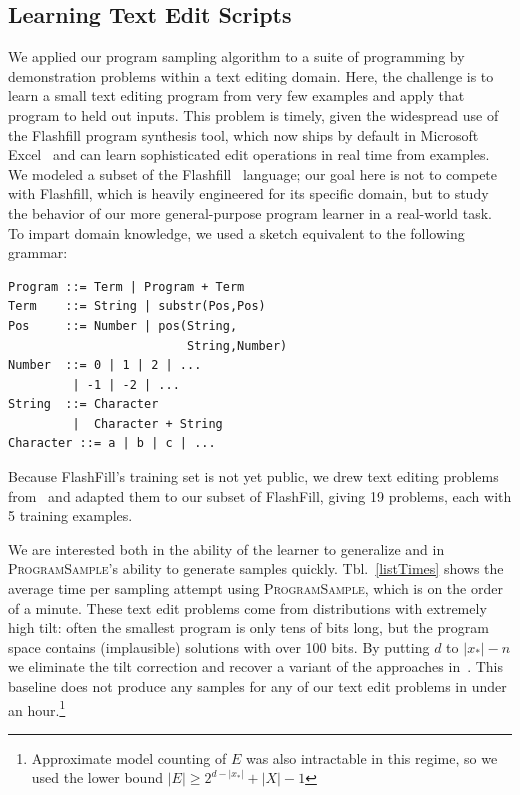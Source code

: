 \documentclass{article}
\newcommand{\theSystem}{\textsc{ProgramSample}}
\begin{document}
\subsection{Learning Text Edit Scripts}
We applied our program sampling algorithm to a suite of programming by demonstration problems within a text editing domain.
Here, the challenge is to learn a small text editing program from very few examples
and apply that program to held out inputs.
This problem is timely, given the widespread use of the Flashfill program synthesis tool, which now ships by default in Microsoft Excel~\cite{real_world} and can learn sophisticated edit operations in real time from examples.
We modeled a subset of the Flashfill~\cite{Gulwani:2011:ASP:1926385.1926423} language;
our goal here is not to compete with Flashfill, which is heavily engineered for its specific domain,
but to study the behavior of our more general-purpose program learner in a real-world task.
To impart domain knowledge, we used a sketch equivalent to the following grammar:
\begin{verbatim}
Program ::= Term | Program + Term
Term    ::= String | substr(Pos,Pos)
Pos     ::= Number | pos(String,
                         String,Number)
Number  ::= 0 | 1 | 2 | ... 
         | -1 | -2 | ...
String  ::= Character 
         |  Character + String
Character ::= a | b | c | ...
\end{verbatim}
Because FlashFill's training set is not yet public, we drew text editing problems from~\cite{DBLP:conf/ecai/LinDETM14} and adapted them to our subset of FlashFill, giving 19 problems, each with 5 training examples.

We are interested both in the ability of the learner to generalize
and in \theSystem{}'s ability to generate samples quickly.
Tbl.~\ref{listTimes} shows the average time per sampling attempt using \theSystem{}, which is on the order of a minute.
These text edit problems come from distributions with extremely high tilt: often the smallest program is only tens of  bits long, but the program space contains (implausible) solutions with over 100 bits.
 By putting $d$ to $\lvert x_* \rvert -n$ we eliminate the tilt correction and recover a variant of the approaches in~\cite{ermon2013embed}. %
This baseline does not produce any samples for any of our text edit problems in under an hour.\footnote{Approximate model counting of $E$ was also intractable in this regime, so we used the lower bound $|E|\geq 2^{d-\lvert x_* \rvert } + |X| - 1$}
\end{document}

